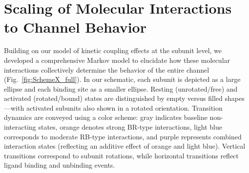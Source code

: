 \documentclass[pdflatex,sn-nature]{sn-jnl}%
\theoremstyle{thmstyleone}%
\theoremstyle{thmstyletwo}%
\theoremstyle{thmstylethree}%
\begin{document}
\section{Scaling of Molecular Interactions to Channel Behavior}
Building on our model of kinetic coupling effects at the subunit level, we developed a comprehensive Markov model to elucidate how these molecular interactions collectively determine the behavior of the entire channel (Fig.~\ref{fig:SchemeX_full}). In our schematic, each subunit is depicted as a large ellipse and each binding site as a smaller ellipse. Resting (unrotated/free) and activated (rotated/bound) states are distinguished by empty versus filled shapes—with activated subunits also shown in a rotated orientation. Transition dynamics are conveyed using a color scheme: gray indicates baseline non-interacting states, orange denotes strong BR-type interactions, light blue corresponds to moderate RB-type interactions, and purple represents combined interaction states (reflecting an additive effect of orange and light blue). Vertical transitions correspond to subunit rotations, while horizontal transitions reflect ligand binding and unbinding events.
\end{document}
